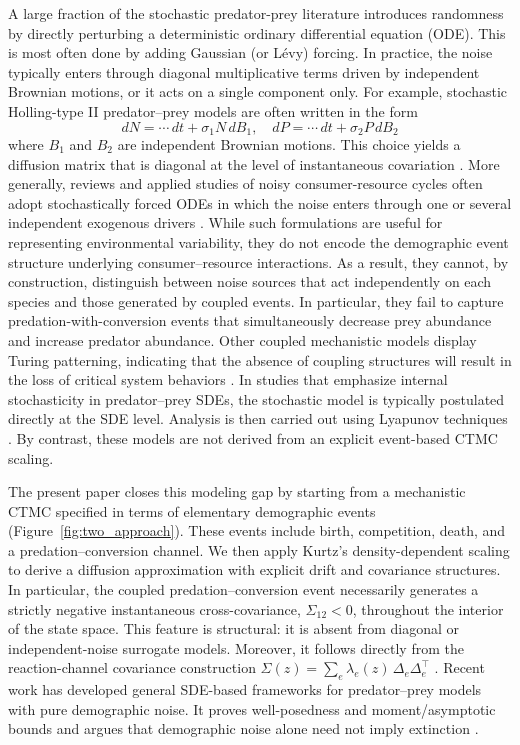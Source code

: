 \documentclass[pdflatex,sn-mathphys-ay]{sn-jnl}
\theoremstyle{thmstyleone}
\theoremstyle{definition}
\theoremstyle{remark}
\begin{document}
A large fraction of the stochastic predator-prey literature introduces randomness by directly perturbing a deterministic ordinary differential equation (ODE). This is most often done by adding Gaussian (or L\'evy) forcing. In practice, the noise typically enters through diagonal multiplicative terms driven by independent Brownian motions, or it acts on a single component only.
For example, stochastic Holling-type II predator--prey models are often written in the form
\[
dN=\cdots\,dt+\sigma_1 N\,dB_1,\quad dP=\cdots\,dt+\sigma_2 P\,dB_2
\]
where $B_1$ and $B_2$ are independent Brownian motions. This choice yields a diffusion matrix that is diagonal at the level of instantaneous covariation \citep{zhang_global_2017,jiang_analysis_2020,zou_survivability_2020,huang_stochastic_2021}.
More generally, reviews and applied studies of noisy consumer-resource cycles often adopt stochastically forced ODEs in which the noise enters through one or several independent exogenous drivers 
\citep{barraquand_moving_2017}.
While such formulations are useful for representing environmental variability, they do not encode the demographic event structure underlying consumer--resource interactions.
As a result, they cannot, by construction, distinguish between noise sources that act independently on each species and those generated by coupled events. 
In particular, they fail to capture predation-with-conversion events that simultaneously decrease prey abundance and increase predator abundance.
Other coupled mechanistic models display Turing patterning, indicating that the absence of coupling structures will result in the loss of critical system behaviors \citep{liu_bidirectional_2025}.  
In studies that emphasize internal stochasticity in predator--prey SDEs, the stochastic model is typically postulated directly at the SDE level. Analysis is then carried out using Lyapunov techniques \citep{abundo_stochastic_1991}. By contrast, these models are not derived from an explicit event-based CTMC scaling.

The present paper closes this modeling gap by starting from a mechanistic CTMC specified in terms of elementary demographic events (Figure~\ref{fig:two_approach}). These events include birth, competition, death, and a predation--conversion channel. We then apply Kurtz's density-dependent scaling to derive a diffusion approximation with explicit drift and covariance structures.
In particular, the coupled predation--conversion event necessarily generates a strictly negative instantaneous cross-covariance, $\Sigma_{12}<0$, throughout the interior of the state space. 
This feature is structural: it is absent from diagonal or independent-noise surrogate models.
Moreover, it follows directly from the reaction-channel covariance construction
$\Sigma(z)=\sum_e \lambda_e(z)\,\Delta_e\Delta_e^\top$ \citep{anderson_constrained_2019,leite_constrained_2019}.
Recent work has developed general SDE-based frameworks for predator–prey models with pure demographic noise. It proves well-posedness and moment/asymptotic bounds and argues that demographic noise alone need not imply extinction \citep{wang_analysis_2025-1}.
\end{document}
